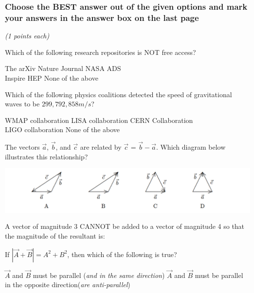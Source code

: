 \documentclass[12pt,addpoints]{exam}
\begin{document}
{{{				\subsubsection*{Choose the BEST answer out of the given options and mark your answers in the answer box on the last page}\textit{(1 points each)} 
				\begin{questions}
					\question Which of the following research repositories is NOT free access? \\
					\begin{oneparchoices}
						\choice The arXiv
						\choice Nature Journal
						\choice NASA ADS \\
						\choice Inspire HEP
						\choice None of the above
					\end{oneparchoices}	
					\question Which of the following physics coalitions detected the speed of gravitational waves to be $299,792,858m/s$? \\
					\begin{oneparchoices}
						\choice WMAP collaboration
						\choice LISA collaboration 
						\choice CERN Collaboration \\
						\choice LIGO collaboration
						\choice None of the above
					\end{oneparchoices}
					\question  The vectors $\vec{a}$, $\vec{b}$, and $\vec{c}$ are related by $\vec{c}$ = $\vec{b}-\vec{a}$. Which diagram below illustrates this
					relationship?
					\begin{center}
						\includegraphics[scale=0.4]{vecs.png}
					\end{center}
					\question A vector of magnitude 3 CANNOT be added to a vector of magnitude 4 so that the magnitude of the resultant is:\\
					\begin{oneparchoices}
						\choice 0
						\choice 1
						\choice 3
						\choice 7
						\choice 5
					\end{oneparchoices}
					\question If $|\vec{A}+\vec{B}|=A^2+B^2$, then which of the following is true?
					\begin{choices}
						\choice $\vec{A}$ and $\vec{B}$ must be parallel (\textit{and in the same direction})
						\choice $\vec{A}$ and $\vec{B}$ must be parallel in the opposite direction(\textit{are anti-parallel})

\end{choices}
\end{questions}}}}
\end{document}
